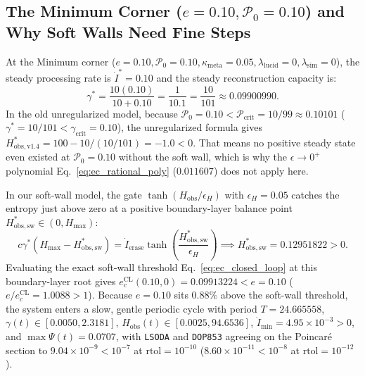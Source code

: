 \documentclass[11pt,a4paper]{article}
\theoremstyle{definition}
\begin{document}
\subsection{The Minimum Corner \texorpdfstring{($e=0.10, \mathcal{P}_0=0.10$)}{(e=0.10, P0=0.10)} and Why Soft Walls Need Fine Steps}

At the Minimum corner ($e=0.10, \mathcal{P}_0=0.10, \kappa_{\mathrm{meta}}=0.05, \lambda_{\mathrm{lucid}}=0, \lambda_{\mathrm{sim}}=0$), the steady processing rate is $\dot{I}^* = 0.10$ and the steady reconstruction capacity is:
\begin{equation}
\gamma^* = \frac{10(0.10)}{10 + 0.10} = \frac{1}{10.1} = \frac{10}{101} \approx 0.09900990.
\end{equation}
In the old unregularized model, because $\mathcal{P}_0 = 0.10 < \mathcal{P}_{\mathrm{crit}} = 10/99 \approx 0.10101$ ($\gamma^* = 10/101 < \gamma_{\mathrm{crit}} = 0.10$), the unregularized formula gives $H_{\mathrm{obs},\mathrm{v1.4}}^* = 100 - 10/(10/101) = -1.0 < 0$. That means no positive steady state even existed at $\mathcal{P}_0 = 0.10$ without the soft wall, which is why the $\epsilon \to 0^+$ polynomial Eq.~\eqref{eq:ec_rational_poly} ($0.011607$) does not apply here.

In our soft-wall model, the gate $\tanh(H_{\mathrm{obs}}/\epsilon_H)$ with $\epsilon_H = 0.05$ catches the entropy just above zero at a positive boundary-layer balance point $H_{\mathrm{obs},\mathrm{sw}}^* \in (0, H_{\max})$:
\begin{equation}
c\gamma^*(H_{\max} - H_{\mathrm{obs},\mathrm{sw}}^*) = \dot{I}_{\mathrm{erase}}\tanh\!\left(\frac{H_{\mathrm{obs},\mathrm{sw}}^*}{\epsilon_H}\right) \implies H_{\mathrm{obs},\mathrm{sw}}^* = 0.12951822 > 0.
\end{equation}
Evaluating the exact soft-wall threshold Eq.~\eqref{eq:ec_closed_loop} at this boundary-layer root gives $e_c^{\mathrm{CL}}(0.10, 0) = 0.09913224 < e = 0.10$ ($e/e_c^{\mathrm{CL}} = 1.0088 > 1$). Because $e = 0.10$ sits $0.88\%$ above the soft-wall threshold, the system enters a slow, gentle periodic cycle with period $T = 24.665558$, $\gamma(t) \in [0.0050, 2.3181]$, $H_{\mathrm{obs}}(t) \in [0.0025, 94.6536]$, $\dot{I}_{\min} = 4.95 \times 10^{-3} > 0$, and $\max \Psi(t) = 0.0707$, with \texttt{LSODA} and \texttt{DOP853} agreeing on the Poincar\'e section to $9.04 \times 10^{-9} < 10^{-7}$ at $\mathrm{rtol}=10^{-10}$ ($8.60 \times 10^{-11} < 10^{-8}$ at $\mathrm{rtol}=10^{-12}$).
\end{document}
